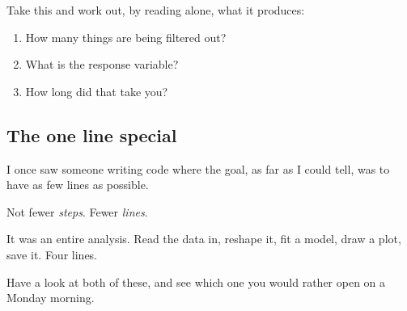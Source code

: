 \documentclass[
  letterpaper,
  justified,
  a4paper]{tufte-book}
\makeatletter
\newenvironment{Shaded}{\begin{snugshade}}{\end{snugshade}}
\newcommand{\AttributeTok}[1]{\textcolor[rgb]{0.40,0.45,0.13}{#1}}
\newcommand{\DecValTok}[1]{\textcolor[rgb]{0.68,0.00,0.00}{#1}}
\newcommand{\FunctionTok}[1]{\textcolor[rgb]{0.28,0.35,0.67}{#1}}
\newcommand{\NormalTok}[1]{\textcolor[rgb]{0.00,0.23,0.31}{#1}}
\newcommand{\OtherTok}[1]{\textcolor[rgb]{0.00,0.23,0.31}{#1}}
\newcommand{\SpecialCharTok}[1]{\textcolor[rgb]{0.37,0.37,0.37}{#1}}
\providecommand{\tightlist}{%
  \setlength{\itemsep}{0pt}\setlength{\parskip}{0pt}}
\providecommand{\tightlist}{%
  \setlength{\itemsep}{0pt}\setlength{\parskip}{0pt}}
\let\rbporigShaded\Shaded
\let\rbporigendShaded\endShaded
\renewenvironment{Shaded}{%
  \begingroup
  \ifdim\linewidth=\rbpbodywidth
    \advance\linewidth by \@tufte@overhang
    \advance\hsize by \@tufte@overhang
    \advance\columnwidth by \@tufte@overhang
  \fi
  \rbporigShaded
}{%
  \rbporigendShaded
  \endgroup
}
\makeatother
\begin{document}
\begin{tcolorbox}[enhanced jigsaw, arc=.35mm, bottomrule=.15mm, bottomtitle=1mm, breakable, colback=white, colbacktitle=quarto-callout-note-color!10!white, colframe=quarto-callout-note-color-frame, coltitle=black, left=2mm, leftrule=.75mm, opacityback=0, opacitybacktitle=0.6, rightrule=.15mm, title=\textcolor{quarto-callout-note-color}{\faInfo}\hspace{0.5em}{Your Turn}, titlerule=0mm, toprule=.15mm, toptitle=1mm]

Take this and work out, by reading alone, what it produces:

\begin{Shaded}
\end{Shaded}

\begin{enumerate}
\def\labelenumi{\arabic{enumi}.}
\tightlist
\item
  How many things are being filtered out?
\item
  What is the response variable?
\item
  How long did that take you?
\end{enumerate}

\end{tcolorbox}

\subsection{The one line special}\label{the-one-line-special}

I once saw someone writing code where the goal, as far as I could tell,
was to have as few lines as possible.

Not fewer \emph{steps}. Fewer \emph{lines}.

It was an entire analysis. Read the data in, reshape it, fit a model,
draw a plot, save it. Four lines.

Have a look at both of these, and see which one you would rather open on
a Monday morning.
\end{document}
